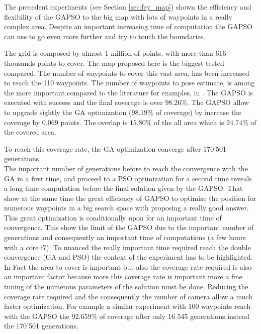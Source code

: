 The precedent experiments (see Section \ref{sec:fey_map}) shown the efficiency and flexibility of the GAPSO to the big map with lots of waypoints in a really complex area. Despite an important increasing time of computation the GAPSO can use to go even more further and try to touch the boundaries.  

The grid is composed by almost 1 million of points, with more than 616 thousands points to cover. The map proposed here is the biggest tested compared. The number of waypoints to cover this vast area, has been increased to reach the 110 waypoints. 
The number of waypoints to pose estimate, is among the more important compared to the literature for examples, in \citep{8*zhou2011,33*reddy2012,82*chrysostomou2012,143*maji2015, 151*zhao2013, 152*wang2009, 165*jiang2010, 193*fu2014, 181*wang2017, 18*ding2012}. %
The GAPSO is executed with success and the final coverage is over $98.26\%$. The GAPSO allow to upgrade sightly the GA optimization ($98.19\%$ of coverage) by increase the coverage by  0.069 points. The overlap is $15.80\%$ of the all area which is  $24.74\%$ of the covered area. 
	
	 To reach this coverage rate, the GA optimization converge after 170'501 generations. \\
	 The important number of generations before to reach the convergence with the GA in a first time, and  proceed to a PSO optimization for a second time reveals a long time computation before the final solution given by the GAPSO. 
	 That show at the same time the great efficiency of GAPSO to optimize the position for numerous waypoints in a big search space with proposing a really good answer. This great optimization is conditionally upon for an important time of convergence. This show the limit of the GAPSO due to the important number of generations and consequently an important time  of computations (a few hours with a core i7).  
	 To nuanced the really important time required reach the double convergence (GA and PSO) the context of the experiment has to be highlighted. In Fact the area to cover is important but also the coverage rate required is also an important factor because more this coverage rate is important more a fine tuning of the numerous parameters of the solution must be done. 
	 Reducing the coverage rate required and the consequently the number of camera  allow a much faster optimization. For example a similar experiment with  100 waypoints reach with the GAPSO  the $92.659\%$ of coverage after only 16 545 generations instead the 170'501 generations. 
	
